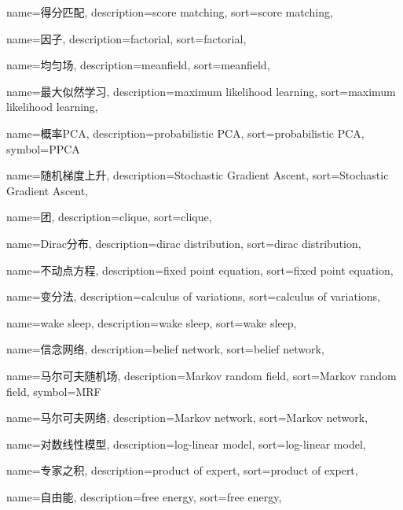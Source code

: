 {
  name=得分匹配,
  description={score matching},
  sort={score matching},
}

{
  name=因子,
  description={factorial},
  sort={factorial},
}

{
  name=均匀场,
  description={meanfield},
  sort={meanfield},
}

{
  name=最大似然学习,
  description={maximum likelihood learning},
  sort={maximum likelihood learning},
}

{
  name=概率PCA,
  description={probabilistic PCA},
  sort={probabilistic PCA},
  symbol={PPCA}
}

{
  name=随机梯度上升,
  description={Stochastic Gradient Ascent},
  sort={Stochastic Gradient Ascent},
}

{
  name=团,
  description={clique},
  sort={clique},
}

{
  name=Dirac分布,
  description={dirac distribution},
  sort={dirac distribution},
}

{
  name=不动点方程,
  description={fixed point equation},
  sort={fixed point equation},
}

{
  name=变分法,
  description={calculus of variations},
  sort={calculus of variations},
}

{
  name=wake sleep,
  description={wake sleep},
  sort={wake sleep},
}

{
  name=信念网络,
  description={belief network},
  sort={belief network},
}

{
  name=马尔可夫随机场,
  description={Markov random field},
  sort={Markov random field},
  symbol={MRF}
}

{
  name=马尔可夫网络,
  description={Markov network},
  sort={Markov network},
}

{
  name=对数线性模型,
  description={log-linear model},
  sort={log-linear model},
}

{
  name=专家之积,
  description={product of expert},
  sort={product of expert},
}

{
  name=自由能,
  description={free energy},
  sort={free energy},
}

